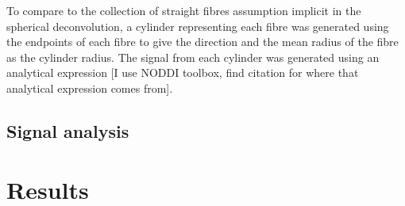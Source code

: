 To compare to the collection of straight fibres assumption implicit in the spherical deconvolution, a cylinder representing each fibre was generated using the endpoints of each fibre to give the direction and the mean radius of the fibre as the cylinder radius. The signal from each cylinder was generated using an analytical expression [I use NODDI toolbox, find citation for where that analytical expression comes from]. 

\subsection{Signal analysis}

\section{Results}
